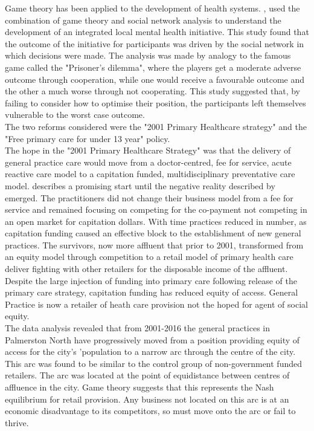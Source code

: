 \documentclass[11pt,a4paper]{article}
\begin{document}
Game theory has been applied to the development of health systems. \citep{dobson2004sustainable}, used the combination of game theory and social network analysis to understand the development of an integrated local mental health initiative. This study found that the outcome of the initiative for participants was driven by the social network in which decisions were made. The analysis was made by analogy to the famous game called the "Prisoner's dilemma", where the players get a moderate adverse outcome through cooperation, while one would receive a favourable outcome and the other a much worse through not cooperating. This study suggested that, by failing to consider how to optimise their position, the participants left themselves vulnerable to the worst case outcome. \\

The two reforms considered were the "2001 Primary Healthcare strategy" \citep{king2001primary} and the "Free primary care for under 13 year" policy\citep{frizelle2014health}.\\

The hope in the "2001 Primary Healthcare Strategy" \citep{king2001primary} was that the delivery of general practice care would move from a doctor-centred, fee for service, acute reactive care model to a capitation funded, multidisciplinary preventative care model. \citet{hefford2005reducing} describes a promising start until the negative reality described by \citet{howell2005restructuring} emerged. The practitioners did not change their business model from a fee for service and remained focusing on competing for the co-payment not competing in an open market for capitation dollars. With time practices reduced in number, as capitation funding caused an effective block to the establishment of new general practices. The survivors, now more affluent that prior to 2001, transformed from an equity model through competition to a retail model of primary health care deliver fighting with other retailers for the disposable income of the affluent. Despite the large injection of funding into primary care following release of the primary care strategy, capitation funding has reduced equity of access. General Practice is now a retailer of heath care provision not the hoped for agent of social equity.\\

The data analysis revealed that from 2001-2016 the general practices in Palmerston North have progressively moved from a position providing equity of access for the city's 'population to a narrow arc through the centre of the city. This arc was found to be similar to the control group of non-government funded retailers. The arc was located at the point of equidistance between centres of affluence in the city. Game theory suggests that this represents the Nash equilibrium for retail provision. Any business not located on this arc is at an economic disadvantage to its competitors, so must move onto the arc or fail to thrive.
\end{document}
